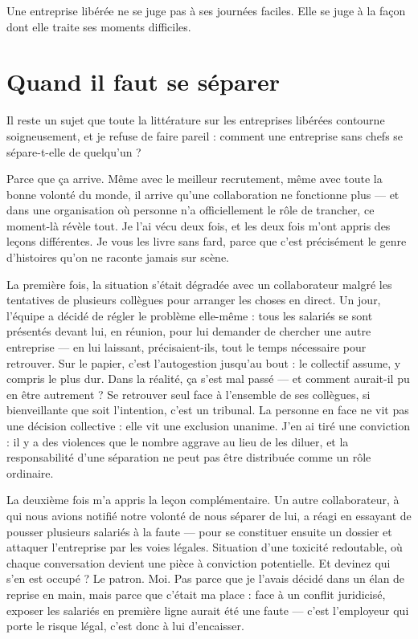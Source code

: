 Une entreprise libérée ne se juge pas à ses journées faciles. Elle se juge à la façon dont elle traite ses moments difficiles.

\section{Quand il faut se séparer}

Il reste un sujet que toute la littérature sur les entreprises libérées contourne soigneusement, et je refuse de faire pareil : comment une entreprise sans chefs se sépare-t-elle de quelqu'un ?

Parce que ça arrive. Même avec le meilleur recrutement, même avec toute la bonne volonté du monde, il arrive qu'une collaboration ne fonctionne plus — et dans une organisation où personne n'a officiellement le rôle de trancher, ce moment-là révèle tout. Je l'ai vécu deux fois, et les deux fois m'ont appris des leçons différentes. Je vous les livre sans fard, parce que c'est précisément le genre d'histoires qu'on ne raconte jamais sur scène.

La première fois, la situation s'était dégradée avec un collaborateur malgré les tentatives de plusieurs collègues pour arranger les choses en direct. Un jour, l'équipe a décidé de régler le problème elle-même : tous les salariés se sont présentés devant lui, en réunion, pour lui demander de chercher une autre entreprise — en lui laissant, précisaient-ils, tout le temps nécessaire pour retrouver. Sur le papier, c'est l'autogestion jusqu'au bout : le collectif assume, y compris le plus dur. Dans la réalité, ça s'est mal passé — et comment aurait-il pu en être autrement ? Se retrouver seul face à l'ensemble de ses collègues, si bienveillante que soit l'intention, c'est un tribunal. La personne en face ne vit pas une décision collective : elle vit une exclusion unanime. J'en ai tiré une conviction : il y a des violences que le nombre aggrave au lieu de les diluer, et la responsabilité d'une séparation ne peut pas être distribuée comme un rôle ordinaire.

La deuxième fois m'a appris la leçon complémentaire. Un autre collaborateur, à qui nous avions notifié notre volonté de nous séparer de lui, a réagi en essayant de pousser plusieurs salariés à la faute — pour se constituer ensuite un dossier et attaquer l'entreprise par les voies légales. Situation d'une toxicité redoutable, où chaque conversation devient une pièce à conviction potentielle. Et devinez qui s'en est occupé ? Le patron. Moi. Pas parce que je l'avais décidé dans un élan de reprise en main, mais parce que c'était ma place : face à un conflit juridicisé, exposer les salariés en première ligne aurait été une faute — c'est l'employeur qui porte le risque légal, c'est donc à lui d'encaisser.

